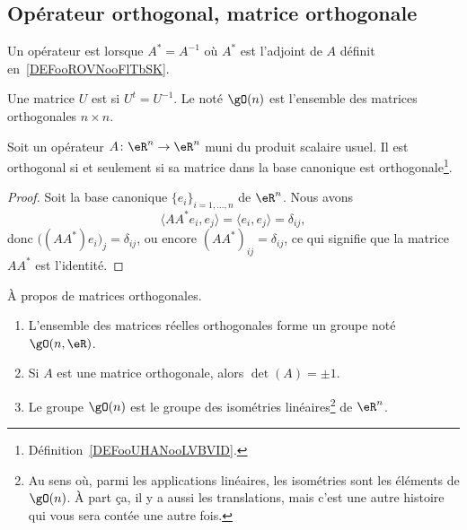 \subsection{Opérateur orthogonal, matrice orthogonale}

\begin{definition}      \label{DEFooYKCSooURQDoS}
	Un opérateur est  lorsque \( A^*=A^{-1}\) où \( A^*\) est l'adjoint de \( A\) définit en~\ref{DEFooROVNooFlTbSK}.
\end{definition}

\begin{definition}      \label{DEFooUHANooLVBVID}
	Une matrice \( U\) est  si \( U^t=U^{-1}\). Le  noté \( \gO(n)\) est l'ensemble des matrices orthogonales \( n\times n\).
\end{definition}

\begin{lemma}       \label{LEMooSSALooSBFzJb}
	Soit un opérateur \( A\colon \eR^n\to \eR^n\) muni du produit scalaire usuel. Il est orthogonal si et seulement si sa matrice dans la base canonique est orthogonale\footnote{Définition~\ref{DEFooUHANooLVBVID}.}.
\end{lemma}

\begin{proof}
	Soit la base canonique \( \{ e_i \}_{i=1,\ldots, n}\) de \( \eR^n\). Nous avons
	\begin{equation}
		\langle AA^*e_i, e_j\rangle =\langle e_i, e_j\rangle =\delta_{ij},
	\end{equation}
	donc \( \big( (AA^*)e_i \big)_j=\delta_{ij}\), ou encore \( (AA^*)_{ij}=\delta_{ij}\), ce qui signifie que la matrice \( AA^*\) est l'identité.
\end{proof}

\begin{proposition}     \label{PropKBCXooOuEZcS}
	À propos de matrices orthogonales.
	\begin{enumerate}
		\item       \label{ITEMooHSTAooIbVrwa}
		      L'ensemble des matrices réelles orthogonales forme un groupe noté \( \gO(n,\eR)\).
		\item
		      Si \( A\) est une matrice orthogonale, alors \( \det(A)=\pm 1\).
		\item       \label{ITEMooOWMBooHUatNb}
		      Le groupe \( \gO(n)\) est le groupe des isométries linéaires\footnote{Au sens où, parmi les applications linéaires, les isométries sont les éléments de \( \gO(n)\). À part ça, il y a aussi les translations, mais c'est une autre histoire qui vous sera contée une autre fois.} de \( \eR^n\).
	\end{enumerate}
\end{proposition}

